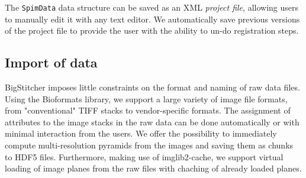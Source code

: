 The \texttt{SpimData} data structure can be saved as an XML \emph{project file}, allowing users to manually edit it with any text editor. We automatically save previous versions of the project file to provide the user with the ability to un-do registration steps.

\subsection*{Import of data}

BigStitcher imposes little constraints on the format and naming of raw data files. Using the Bioformats \cite{bioformats} library, we support a large variety of image file formats, from "conventional" TIFF stacks to vendor-specific formats. The assignment of attributes to the image stacks in the raw data can be done automatically or with minimal interaction from the users. We offer the possibility to immediately compute multi-resolution pyramids from the images and saving them as chunks to HDF5 files. Furthermore, making use of imglib2-cache, we support virtual loading of image planes from the raw files with chaching of already loaded planes.

\begin{comment}
\subsection{Illumination selection}

When imaging large samples with multiple illumination directions,  a lot of unnecessary images are acquired since typically, only illumination from one direction provides optimal images. We therefore implemented a simple \emph{illumination selection} functionality in BigStitcher. It starts by \emph{combining} all (selected) images by their \texttt{Illumination} attribute, i.e. it groups images that share all other attributes besides \texttt{Illumination}. In each of the resulting groups we select a best image. We do this by loading the pixel data for all images in the group at the lowest resolution level (in the case of non-multiresolution images, this corresponds to the original image) and calculating a \emph{quality metric}. We currently offer mean intensity and mean gradient magnitude as quality metrics. The image with the highest score is kept, while all other images are marked as \emph{missing} in the \texttt{SpimData}, which will lead to them being ignored in subsequent processing steps. 
\end{comment}

